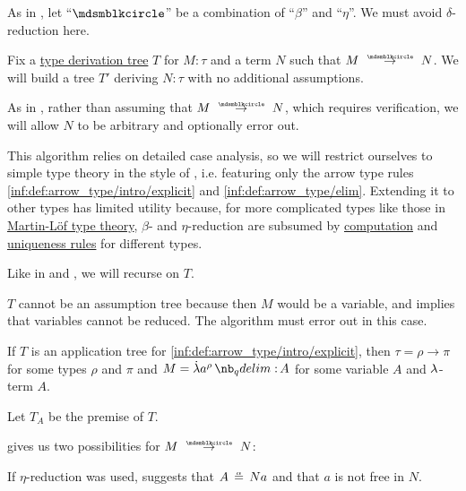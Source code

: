 \begin{algorithm}\label{alg:simply_typed_reduction}
  As in , let \enquote{\( {\Anon} \)} be a combination of \enquote{\( \beta \)} and \enquote{\( \eta \)}. We must avoid \( \delta \)-reduction here.

  Fix a \hyperref[def:type_derivation_tree]{type derivation tree} \( T \) for \( M: \tau \) and a term \( N \) such that \( M \pred N \). We will build a tree \( T' \) deriving \( N: \tau \) with no additional assumptions.

  As in , rather than assuming that \( M \pred N \), which requires verification, we will allow \( N \) to be arbitrary and optionally error out.

  This algorithm relies on detailed case analysis, so we will restrict ourselves to simple type theory in the style of , i.e. featuring only the arrow type rules \ref{inf:def:arrow_type/intro/explicit} and \ref{inf:def:arrow_type/elim}. Extending it to other types has limited utility because, for more complicated types like those in \hyperref[def:mltt]{Martin-L\"of type theory}, \( \beta \)- and \( \eta \)-reduction are subsumed by \hyperref[rem:type_theory_rule_classification/equality/comp]{computation} and \hyperref[rem:type_theory_rule_classification/equality/uniq]{uniqueness rules} for different types.

  Like in  and , we will recurse on \( T \).

  \begin{thmenum}
     \( T \) cannot be an assumption tree because then \( M \) would be a variable, and  implies that variables cannot be reduced. The algorithm must error out in this case.

     If \( T \) is an application tree for \ref{inf:def:arrow_type/intro/explicit}, then \( \tau = \rho \rightarrow \pi \) for some types \( \rho \) and \( \pi \) and \( M = \qabs {a^\rho} A \) for some variable \( A \) and \( {\mathrm \lambda} \)-term \( A \).

    Let \( T_A \) be the premise of \( T \).

     gives us two possibilities for \( M \pred N \):
    \begin{thmenum}
       If \( \eta \)-reduction was used,  suggests that \( A \aequiv Na \) and that \( a \) is not free in \( N \).


\end{thmenum}
\end{thmenum}
\end{algorithm}
